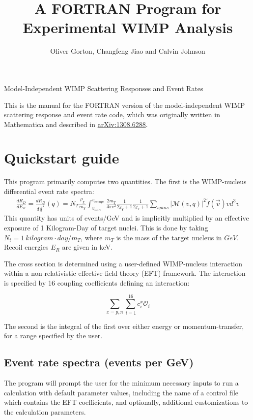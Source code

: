 \documentclass[11pt]{amsart}
\title{A FORTRAN Program for Experimental WIMP Analysis}
\author{Oliver Gorton, Changfeng Jiao and Calvin Johnson}
\begin{document}
\maketitle

{

\centering

Model-Independent WIMP Scattering Responses and Event Rates

}

\tableofcontents

This is the manual for the FORTRAN version of the model-independent WIMP scattering response and event rate code, which was originally written in Mathematica and described in \href{http://arxiv.org/abs/1308.6288v1}{arXiv:1308.6288}.

\clearpage

\section{Quickstart guide}
This program primarily computes two quantities. The first is the WIMP-nucleus
differential event rate spectra:
\begin{equation}
\begin{split}
        \frac{dR_D}{dE_R} = \frac{dR_D}{d\vec{q}^2}(q)
	= N_T\frac{\rho_\chi}{m_\chi}\int_{v_{min}}^{v_{escape}} \frac{2m_T}{4\pi v^2}\frac{1}{2j_\chi+1}\frac{1}{2j_T+1}\sum_{spins}|\mathcal{M}(v,q)|^2  \tilde{f}(\vec{v})vd^3v
\end{split}
\end{equation}
This quantity has units of events/GeV and is implicitly multiplied by
an effective exposure of 1 Kilogram-Day of target nuclei. This is done by
taking $N_t = 1\ kilogram\cdot day / m_T$, where $m_T$ is the mass of the target
nucleus in $GeV$. Recoil energies $E_R$ are given in keV.

The cross section is determined using a user-defined WIMP-nucleus interaction
within a non-relativistic effective field theory (EFT) framework. The
interaction is specified by 16 coupling coefficients defining an interaction:

\begin{equation}
	\sum_{x=p,n}\sum_{i=1}^{16} c_i^x \mathcal{O}_i
\end{equation}

The second is the integral of the first over either energy or momentum-transfer,
for a range specified by the user. 

\subsection{Event rate spectra (events per GeV)}
The program will prompt the user for 
the minimum necessary inputs to run a calculation with default parameter 
values, including the name of a control file which contains the EFT
coefficients, and optionally, additional customizations to the calculation
parameters.
\end{document}
